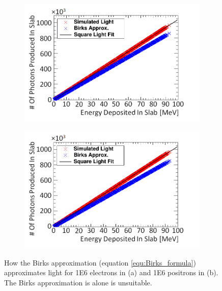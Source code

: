 \begin{figure}[htbp]
\centering
\begin{subfigure}{.5\textwidth}
  \centering
  \includegraphics[width=\linewidth]{Chapter4/Figs/Raster/electronSimulatedLightNew.png}
  \captionsetup{width=.9\linewidth}
  \caption{}
  \label{subfig:append5_light_of_electrons0-100mev}
\end{subfigure}%
\begin{subfigure}{.5\textwidth}
  \centering
  \includegraphics[width=\linewidth]{Chapter4/Figs/Raster/positronSimulatedLightNew.png}
  \captionsetup{width=.9\linewidth}
  \caption{}
  \label{subfig:append5_light_of_positrons0-100mev}
\end{subfigure}
\caption[Birks' light approximation for electrons and positrons compared to simulation.]{How the Birks approximation (equation \ref{equ:Birks_formula}) approximates light for 1E6 electrons in (a) and 1E6 positrons in (b). The Birks approximation is alone is unsuitable.}
\label{fig:append5_light_of_electrons_positrons0-100mev}
\end{figure}

